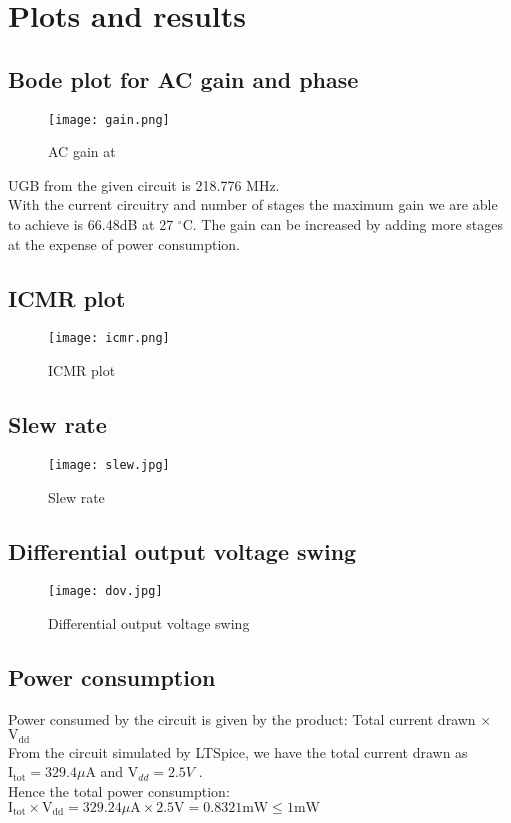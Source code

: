 \documentclass[titlepage]{article}
\begin{document}
\section{Plots and results}

\subsection{Bode plot for AC gain and phase}
\begin{figure}[ht]
    \centering
    \texttt{[image: gain.png]}
    \caption{AC gain at }
    \label{fig:acgain}
\end{figure}
\noindent UGB from the given circuit is 218.776 MHz. \\With the current circuitry and number of stages the maximum gain we are able to achieve is 66.48dB at 27 $^{\circ}$C. The gain can be increased by adding more stages at the expense of power consumption.
\subsection{ICMR plot}
\begin{figure}[ht]
    \centering
    \texttt{[image: icmr.png]}
    \caption{ICMR plot}
    \label{fig:icmr}
\end{figure}
\newpage
\subsection{Slew rate}
\begin{figure}[ht]
    \centering
    \texttt{[image: slew.jpg]}
    \caption{Slew rate}
    \label{fig:sr}
\end{figure}
\newpage
\subsection{Differential output voltage swing}
\begin{figure}[ht]
    \centering
    \texttt{[image: dov.jpg]}
    \caption{Differential output voltage swing}
    \label{fig:diff}
\end{figure}
\subsection{Power consumption}
Power consumed by the circuit is given by the product: Total current drawn $\times$ $\text{V}_{\text{dd}}$ \\
From the circuit simulated by LTSpice, we have the total current drawn as $\text{I}_{\text{tot}} = 329.4 \mu \text{A}$ and $\text{V}_{dd} = 2.5V$ . \\
Hence  the total power consumption: $\text{I}_{\text{tot}}\times\text{V}_{\text{dd}} = 329.24\mu \text{A} \times 2.5 \text{V} = 0.8321 \text{mW} \leq 1 \text{mW}$
\end{document}
